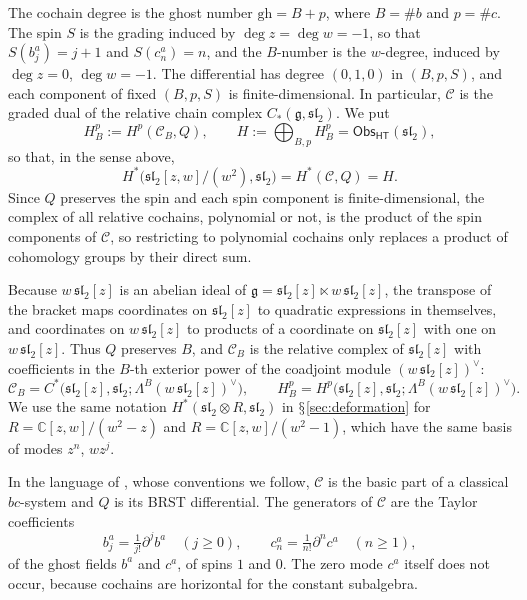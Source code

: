 \documentclass[11pt]{amsart}
\numberwithin{equation}{section}
\renewcommand{\S}{\mbox{$\mathsection$}}
\theoremstyle{definition}
\theoremstyle{remark}
\newcommand{\C}{\mathbb{C}}
\newcommand{\g}{\mathfrak{g}}
\newcommand{\sltwo}{\mathfrak{sl}_2}
\newcommand{\dd}{\partial}
\newcommand{\Obs}{\mathsf{Obs}_{\mathsf{HT}}}
\newcommand{\cC}{\mathcal{C}}
\newcommand{\gh}{\mathrm{gh}}
\begin{document}
The cochain degree is the ghost number $\gh=B+p$, where $B=\#b$ and $p=\#c$. The spin $S$ is the grading induced by $\deg z=\deg w=-1$, so that $S(b_j^a)=j+1$ and $S(c_n^a)=n$, and the $B$-number is the $w$-degree, induced by $\deg z=0$, $\deg w=-1$. The differential has degree $(0,1,0)$ in $(B,p,S)$, and each component of fixed $(B,p,S)$ is finite-dimensional. In particular, $\cC$ is the graded dual of the relative chain complex $C_*(\g,\sltwo)$. We put
\begin{equation}\label{eq:H}
H_B^p:=H^p(\cC_B,Q),\qquad H:=\bigoplus_{B,p}H_B^p=\Obs(\sltwo),
\end{equation}
so that, in the sense above,
\begin{equation}\label{eq:Hdef}
H^*\bigl(\sltwo[z,w]/(w^2),\sltwo\bigr)=H^*(\cC,Q)=H .
\end{equation}
Since $Q$ preserves the spin and each spin component is finite-dimensional, the complex of all relative cochains, polynomial or not, is the product of the spin components of $\cC$, so restricting to polynomial cochains only replaces a product of cohomology groups by their direct sum.

Because $w\,\sltwo[z]$ is an abelian ideal of $\g=\sltwo[z]\ltimes w\,\sltwo[z]$, the transpose of the bracket maps coordinates on $\sltwo[z]$ to quadratic expressions in themselves, and coordinates on $w\,\sltwo[z]$ to products of a coordinate on $\sltwo[z]$ with one on $w\,\sltwo[z]$. Thus $Q$ preserves $B$, and $\cC_B$ is the relative complex of $\sltwo[z]$ with coefficients in the $B$-th exterior power of the coadjoint module $(w\,\sltwo[z])^\vee$:
\begin{equation}\label{eq:CB-coeff}
\cC_B=C^*\bigl(\sltwo[z],\sltwo;\Lambda^B(w\,\sltwo[z])^\vee\bigr),\qquad
H_B^p=H^p\bigl(\sltwo[z],\sltwo;\Lambda^B(w\,\sltwo[z])^\vee\bigr).
\end{equation}
We use the same notation $H^*(\sltwo\otimes R,\sltwo)$ in \S\ref{sec:deformation} for $R=\C[z,w]/(w^2-z)$ and $R=\C[z,w]/(w^2-1)$, which have the same basis of modes $z^n$, $wz^j$.

In the language of \cite[\S3]{Kha26}, whose conventions we follow, $\cC$ is the basic part of a classical $bc$-system and $Q$ is its BRST differential. The generators of $\cC$ are the Taylor coefficients
\begin{equation}\label{eq:modes}
b_j^a=\tfrac1{j!}\dd^jb^a\quad(j\ge0),\qquad c_n^a=\tfrac1{n!}\dd^nc^a\quad(n\ge1),
\end{equation}
of the ghost fields $b^a$ and $c^a$, of spins $1$ and $0$. The zero mode $c^a$ itself does not occur, because cochains are horizontal for the constant subalgebra.
\end{document}
